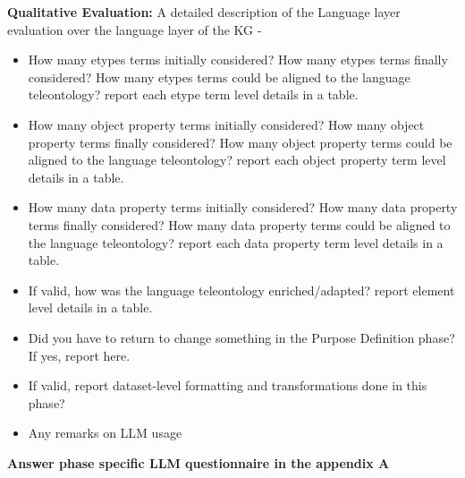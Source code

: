 \noindent \textbf{Qualitative Evaluation:} A detailed description of the Language layer evaluation over the language layer of the KG -
\begin{itemize}
    \item How many etypes terms initially considered? How many etypes terms finally considered? How many etypes terms could be aligned to the  language teleontology? report each etype term level details in a table.
    \item How many object property terms initially considered? How many object property terms finally considered?  How many object property terms could be aligned to the  language teleontology? report each object property term level details in a table.
    \item How many data property terms initially considered? How many data property terms finally considered?  How many data property terms could be aligned to the language teleontology? report each data property term level details in a table.
    \item If valid, how was the language teleontology enriched/adapted? report element level details in a table.
    \item Did you have to return to change something in the Purpose Definition phase? If yes, report here.
    \item If valid, report dataset-level formatting and transformations done in this phase?
    \item Any remarks on LLM usage
\end{itemize}

\noindent \textbf{Answer phase specific LLM questionnaire in the appendix A}